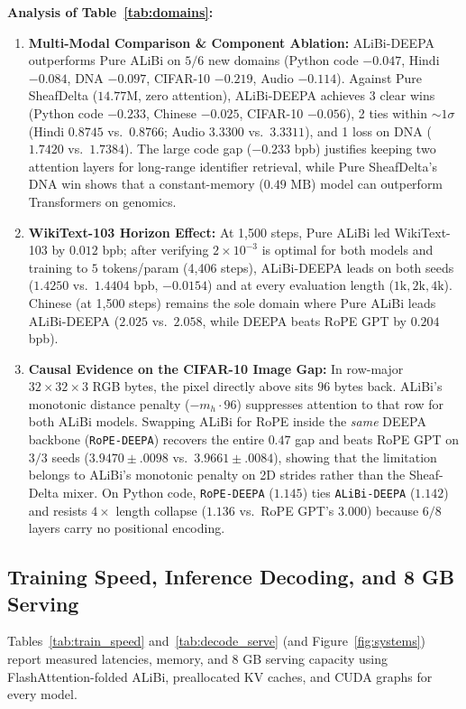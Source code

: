 \documentclass[10pt,a4paper]{article}
\begin{document}
\noindent\textbf{Analysis of Table~\ref{tab:domains}:}
\begin{enumerate}
  \item \textbf{Multi-Modal Comparison \& Component Ablation:} ALiBi-DEEPA outperforms Pure ALiBi on $5/6$ new domains (Python code $-0.047$, Hindi $-0.084$, DNA $-0.097$, CIFAR-10 $-0.219$, Audio $-0.114$). Against Pure SheafDelta ($14.77\text{M}$, zero attention), ALiBi-DEEPA achieves 3 clear wins (Python code $-0.233$, Chinese $-0.025$, CIFAR-10 $-0.056$), 2 ties within $\sim 1\sigma$ (Hindi $0.8745$ vs.\ $0.8766$; Audio $3.3300$ vs.\ $3.3311$), and 1 loss on DNA ($1.7420$ vs.\ $1.7384$). The large code gap ($-0.233$ bpb) justifies keeping two attention layers for long-range identifier retrieval, while Pure SheafDelta's DNA win shows that a constant-memory ($0.49\text{ MB}$) model can outperform Transformers on genomics.
  \item \textbf{WikiText-103 Horizon Effect:} At 1,500 steps, Pure ALiBi led WikiText-103 by $0.012$ bpb; after verifying $2\times 10^{-3}$ is optimal for both models and training to $5$ tokens/param (4,406 steps), ALiBi-DEEPA leads on both seeds ($1.4250$ vs.\ $1.4404$ bpb, $-0.0154$) and at every evaluation length ($1\text{k}, 2\text{k}, 4\text{k}$). Chinese (at 1,500 steps) remains the sole domain where Pure ALiBi leads ALiBi-DEEPA ($2.025$ vs.\ $2.058$, while DEEPA beats RoPE GPT by $0.204$ bpb).
  \item \textbf{Causal Evidence on the CIFAR-10 Image Gap:} In row-major $32\times 32\times 3$ RGB bytes, the pixel directly above sits $96$ bytes back. ALiBi's monotonic distance penalty ($-m_h\cdot 96$) suppresses attention to that row for both ALiBi models. Swapping ALiBi for RoPE inside the \emph{same} DEEPA backbone (\texttt{RoPE-DEEPA}) recovers the entire $0.47$ gap and beats RoPE GPT on $3/3$ seeds ($3.9470 \pm .0098$ vs.\ $3.9661 \pm .0084$), showing that the limitation belongs to ALiBi's monotonic penalty on 2D strides rather than the Sheaf-Delta mixer. On Python code, \texttt{RoPE-DEEPA} ($1.145$) ties \texttt{ALiBi-DEEPA} ($1.142$) and resists $4\times$ length collapse ($1.136$ vs.\ RoPE GPT's $3.000$) because $6/8$ layers carry no positional encoding.
\end{enumerate}

\subsection{Training Speed, Inference Decoding, and 8 GB Serving}
\label{sec:systems}
Tables~\ref{tab:train_speed} and~\ref{tab:decode_serve} (and Figure~\ref{fig:systems}) report measured latencies, memory, and 8 GB serving capacity using FlashAttention-folded ALiBi, preallocated KV caches, and CUDA graphs for every model.
\end{document}
